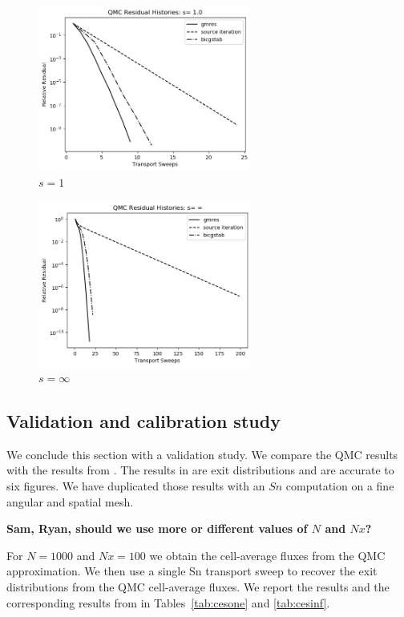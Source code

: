 \begin{figure}[t]%
  \centering
  \includegraphics[trim = 10mm 0mm 15mm 15mm, width=70mm]{FIGURES/seqone.png}
  \caption{$s = 1$}
  \label{fig:easy}
\end{figure}

\begin{figure}[t]%
  \centering
  \includegraphics[trim = 10mm 0mm 15mm 15mm, width=70mm]{FIGURES/seqinf.png}
  \caption{$s = \infty$}
  \label{fig:hard}
\end{figure}

\subsection{Validation and calibration study}
\label{validation-and-calibration-study}

We conclude this section with a validation study. We compare the
QMC results with the results from \cite{cesinh}. The results
in \cite{cesinh} are exit distributions and are accurate to 
six figures. We have duplicated those results with an $Sn$ computation
on a fine angular and spatial mesh.

{\bf Sam, Ryan, should we use more or different values of $N$ and $Nx$?}

For $N = 1000$ and $Nx=100$ we obtain the cell-average fluxes from
the QMC approximation. We then use a single Sn transport sweep to recover
the exit distributions from the QMC cell-average fluxes. We report
the results and the corresponding results from \cite{cesinh} in 
Tables~\ref{tab:cesone} and \ref{tab:cesinf}.

